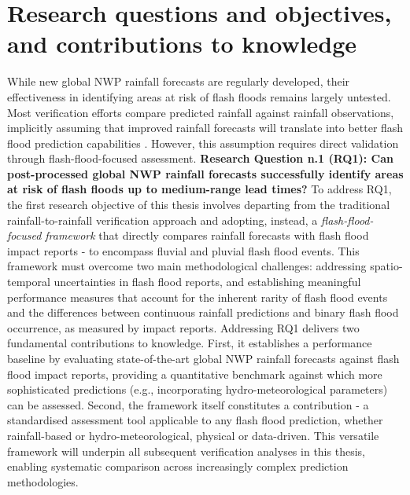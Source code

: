 \section{Research questions and objectives, and contributions to knowledge}
\label{general_introduction_research_questions_objectives_contribution2knowledge}

While  new global NWP rainfall forecasts are regularly developed, their effectiveness in identifying areas at risk of flash floods remains largely untested. Most verification efforts compare predicted rainfall against rainfall observations, implicitly assuming that improved rainfall forecasts will translate into better flash flood prediction capabilities \citep{Gascón_2024}. However, this assumption requires direct validation through flash-flood-focused assessment. \textcolor{colour_chapter5}{\textbf{Research Question n.1 (RQ1): Can post-processed global NWP rainfall forecasts successfully identify areas at risk of flash floods up to medium-range lead times?}} To address RQ1, the first research objective of this thesis involves departing from the traditional rainfall-to-rainfall verification approach and adopting, instead, a \textit{flash-flood-focused framework} that directly compares rainfall forecasts with flash flood impact reports - to encompass fluvial and pluvial flash flood events. This framework must overcome two main methodological challenges: addressing spatio-temporal uncertainties in flash flood reports, and establishing meaningful performance measures that account for the inherent rarity of flash flood events and the differences between continuous rainfall predictions and binary flash flood occurrence, as measured by impact reports. Addressing RQ1 delivers two fundamental contributions to knowledge. First, it establishes a performance baseline by evaluating state-of-the-art global NWP rainfall forecasts against flash flood impact reports, providing a quantitative benchmark against which more sophisticated predictions (e.g., incorporating hydro-meteorological parameters) can be assessed. Second, the framework itself constitutes a contribution - a standardised assessment tool applicable to any flash flood prediction, whether rainfall-based or hydro-meteorological, physical or data-driven. This versatile framework will underpin all subsequent verification analyses in this thesis, enabling systematic comparison across increasingly complex prediction methodologies.

